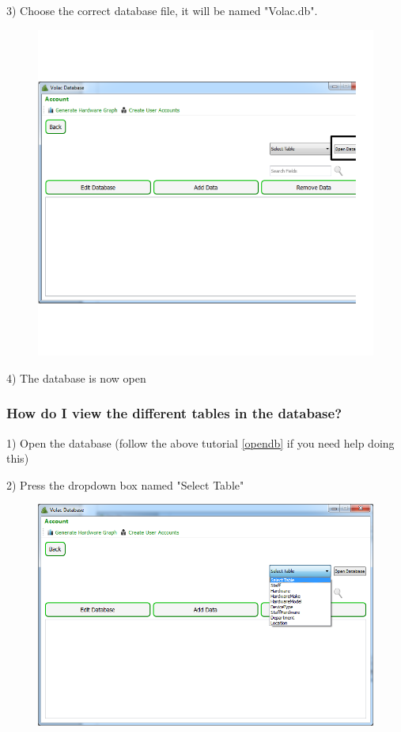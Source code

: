 3) Choose the correct database file, it will be named "Volac.db". 

\begin{figure}[H]
    \includegraphics[width=\textwidth]{./Manual/Images/opendb3.png}
\end{figure}

4) The database is now open


\subsubsection{How do I view the different tables in the database?}\label{viewdb}

1) Open the database (follow the above tutorial \ref{opendb} if you need help doing this)

2) Press the dropdown box named "Select Table" 

\begin{figure}[H]
    \includegraphics[width=\textwidth]{./Manual/Images/table1.png}
\end{figure}

